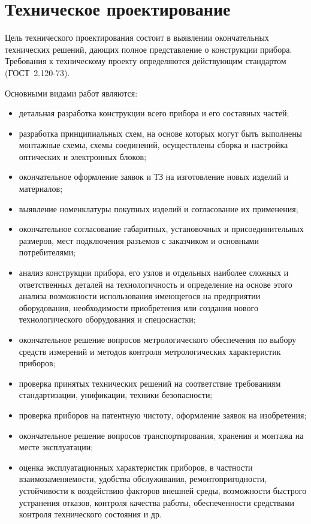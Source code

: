 \section{Техническое проектирование}

Цель технического проектирования состоит в выявлении окончательных технических решений, дающих полное представление о конструкции прибора. Требования к техническому проекту определяются действующим стандартом (ГОСТ~2.120-73).

Основными видами работ являются:
\begin{itemize}
	\item детальная разработка конструкции всего прибора и его составных частей;
	\item разработка принципиальных схем, на основе которых могут быть выполнены монтажные схемы, схемы соединений, осуществлены сборка и настройка оптических и электронных блоков;
	\item окончательное оформление заявок и ТЗ на изготовление новых изделий и материалов;
	\item выявление номенклатуры покупных изделий и согласование их применения;
	\item окончательное согласование габаритных, установочных и присоединительных размеров, мест подключения разъемов с заказчиком и основными потребителями;
	\item анализ конструкции прибора, его узлов и отдельных наиболее сложных и ответственных деталей на технологичность и определение на основе этого анализа возможности использования имеющегося на предприятии оборудования, необходимости приобретения или создания нового технологического оборудования и спецоснастки;
	\item окончательное решение вопросов метрологического обеспечения по выбору средств измерений и методов контроля метрологических характеристик приборов;
	\item проверка принятых технических решений на соответствие требованиям стандартизации, унификации, техники безопасности;
	\item проверка приборов на патентную чистоту, оформление заявок на изобретения;
	\item окончательное решение вопросов транспортирования, хранения и монтажа на месте эксплуатации;
	\item оценка эксплуатационных характеристик приборов, в частности взаимозаменяемости, удобства обслуживания, ремонтопригодности, устойчивости к воздействию факторов внешней среды, возможности быстрого устранения отказов, контроля качества работы, обеспеченности средствами контроля технического состояния и др.
\end{itemize}

